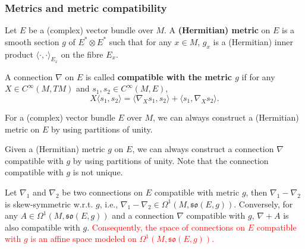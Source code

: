 \subsubsection*{Metrics and metric compatibility}
\begin{definition}
    Let $E$ be a (complex) vector bundle over $M$.
    A \textbf{(Hermitian) metric} on $E$ is a smooth section $g$ of $E^*\otimes E^*$ such that 
    for any $x\in M$, $g_x$ is a (Hermitian) inner product $\langle \cdot, \cdot \rangle_{E_x}$ on the fibre $E_x$. 
\end{definition}
\begin{definition}
    A connection $\nabla$ on $E$ is called \textbf{compatible with the metric $g$} 
    if for any $X\in C^\infty(M,TM)$ and $s_1,s_2\in C^\infty(M,E)$, 
    \begin{equation*}
        X\langle s_1, s_2 \rangle = \langle \nabla_X s_1, s_2 \rangle + \langle s_1, \nabla_X s_2 \rangle.
    \end{equation*}
\end{definition}
\begin{remark}
    For a (complex) vector bundle $E$ over $M$, we can always construct a (Hermitian) metric on $E$ by using partitions of unity. 
\end{remark}
\begin{remark}
    Given a (Hermitian) metric $g$ on $E$, we can always construct a connection $\nabla$ 
    compatible with $g$ by using partitions of unity. Note that the connection compatible with $g$ is not unique.
\end{remark}
\begin{proposition}
    Let $\nabla_1$ and $\nabla_2$ be two connections on $E$ compatible with metric $g$, 
    then $\nabla_1 - \nabla_2$ is skew-symmetric w.r.t. $g$, i.e., $\nabla_1 - \nabla_2 \in \Omega^1(M,\mathfrak{so}(E,g))$. 
    Conversely, for any $A\in \Omega^1(M,\mathfrak{so}(E,g))$ and a connection $\nabla$ compatible with $g$, 
    $\nabla + A$ is also compatible with $g$. 
    \textcolor{red}{Consequently, the space of connections on $E$ compatible with $g$ 
    is an affine space modeled on $\Omega^1(M,\mathfrak{so}(E,g))$.}
\end{proposition}
